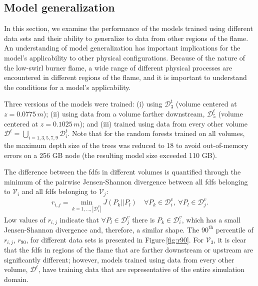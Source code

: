 \documentclass[review]{elsarticle}
\begin{document}
\subsection{Model generalization}\label{sec:predictions_all}

In this section, we examine the performance of the models trained
using different data sets and their ability to generalize to data from
other regions of the flame. An understanding of model generalization
has important implications for the model's applicability to other
physical configurations. Because of the nature of the low-swirl burner
flame, a wide range of different physical processes are encountered in
different regions of the flame, and it is important to understand the
conditions for a model's applicability.

Three versions of the models were trained: (i) using $\mathcal{D}_3^t$
(volume centered at $z=0.0775\,\unit{m}$); (ii) using data from a volume
farther downstream, $\mathcal{D}_5^t$ (volume centered at
$z=0.1025\,\unit{m}$); and (iii) trained using data from every other
volume
$\mathcal{D}^t = \bigcup\limits_{i=1, 3, 5, 7, 9} \mathcal{D}_i^t$.
Note that for the random forests trained on all volumes, the maximum depth size
of the trees was reduced to 18 to avoid out-of-memory errors
on a 256 GB node (the resulting model size exceeded 110 GB).

The difference between the \glspl{fdf} in different volumes is quantified
through the minimum of the pairwise Jensen-Shannon divergence between
all \glspl{fdf} belonging to $\mathcal{V}_i$ and all \glspl{fdf} belonging to
$\mathcal{V}_j$:
\begin{align}
  \label{eq:distance}
  r_{i,j} = \min_{k=1,\dots, |\mathcal{D}_i^v|} J( P_k || P_l )\quad \forall P_k \in \mathcal{D}_i^v,\ \forall P_l \in \mathcal{D}_j^v.
\end{align}
Low values of $r_{i,j}$ indicate that
$\forall P_l \in \mathcal{D}_j^v$ there is $P_k \in \mathcal{D}_i^v$,
which has a small Jensen-Shannon divergence and, therefore, a similar
shape. The $90^{\text{th}}$ percentile of $r_{i,j}$, $r_{90}$, for
different data sets is presented in Figure\,\ref{fig:r90}. For
$\mathcal{V}_3$, it is clear that the \glspl{fdf} in regions of the flame
that are farther downstream or upstream are significantly
different; however, models trained using data from every other volume,
$\mathcal{D}^t$, have training data that are representative of the
entire simulation domain.
\end{document}
